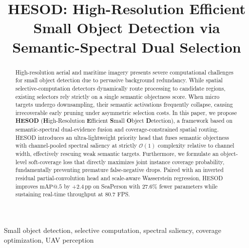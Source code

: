 \documentclass{article}
\title{HESOD: High-Resolution Efficient Small Object Detection via Semantic-Spectral Dual Selection}
\begin{document}
\maketitle

\begin{abstract}
High-resolution aerial and maritime imagery presents severe computational challenges for small object detection due to pervasive background redundancy. While spatial selective-computation detectors dynamically route processing to candidate regions, existing selectors rely strictly on a single semantic objectness score. When micro targets undergo downsampling, their semantic activations frequently collapse, causing irrecoverable early pruning under asymmetric selection costs. In this paper, we propose \textbf{HESOD} (\textbf{H}igh-Resolution \textbf{E}fficient \textbf{S}mall \textbf{O}bject \textbf{D}etection), a framework based on semantic-spectral dual-evidence fusion and coverage-constrained spatial routing. HESOD introduces an ultra-lightweight priority head that fuses semantic objectness with channel-pooled spectral saliency at strictly $\mathcal{O}(1)$ complexity relative to channel width, effectively rescuing weak semantic targets. Furthermore, we formulate an object-level soft-coverage loss that directly maximizes joint instance coverage probability, fundamentally preventing premature false-negative drops. Paired with an inverted residual partial-convolution head and scale-aware Wasserstein regression, HESOD improves $\mathrm{mAP@.5}$ by +2.4\,pp on SeaPerson with 27.6\% fewer parameters while sustaining real-time throughput at 80.7 FPS.
\end{abstract}

\begin{keywords}
Small object detection, selective computation, spectral saliency, coverage optimization, UAV perception
\end{keywords}







\begingroup
\small
\setlength{\itemsep}{0pt plus 0.2ex}
\setlength{\parsep}{0pt}


\endgroup
\end{document}
